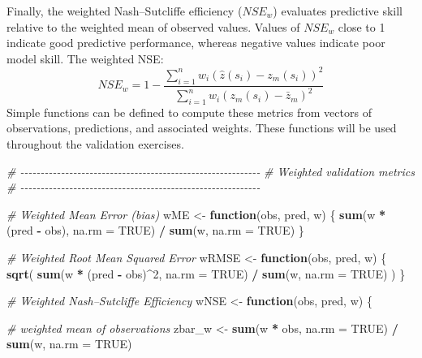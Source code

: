 \documentclass[
  10pt,
  b5paper,
  oneside]{book}
\newenvironment{Shaded}{\begin{snugshade}}{\end{snugshade}}
\newcommand{\AttributeTok}[1]{\textcolor[rgb]{0.13,0.29,0.53}{#1}}
\newcommand{\CommentTok}[1]{\textcolor[rgb]{0.56,0.35,0.01}{\textit{#1}}}
\newcommand{\ConstantTok}[1]{\textcolor[rgb]{0.56,0.35,0.01}{#1}}
\newcommand{\ControlFlowTok}[1]{\textcolor[rgb]{0.13,0.29,0.53}{\textbf{#1}}}
\newcommand{\DecValTok}[1]{\textcolor[rgb]{0.00,0.00,0.81}{#1}}
\newcommand{\FunctionTok}[1]{\textcolor[rgb]{0.13,0.29,0.53}{\textbf{#1}}}
\newcommand{\NormalTok}[1]{#1}
\newcommand{\OtherTok}[1]{\textcolor[rgb]{0.56,0.35,0.01}{#1}}
\newcommand{\SpecialCharTok}[1]{\textcolor[rgb]{0.81,0.36,0.00}{\textbf{#1}}}
\begin{document}
Finally, the weighted Nash--Sutcliffe efficiency (\(NSE_w\)) evaluates predictive skill relative to the weighted mean of observed values.
Values of \(NSE_w\) close to 1 indicate good predictive performance, whereas negative values indicate poor model skill.
The weighted NSE:
\[
NSE_w =
1 -
\frac{
\sum_{i=1}^{n} w_i \left( \hat{z}(s_i) - z_m(s_i) \right)^2
}{
\sum_{i=1}^{n} w_i \left( z_m(s_i) - \bar{z}_m \right)^2
}
\]
Simple functions can be defined to compute these metrics from vectors of observations, predictions, and associated weights. These functions will be used throughout the validation exercises.

\begin{Shaded}
\begin{Highlighting}[]
\CommentTok{\# {-}{-}{-}{-}{-}{-}{-}{-}{-}{-}{-}{-}{-}{-}{-}{-}{-}{-}{-}{-}{-}{-}{-}{-}{-}{-}{-}{-}{-}{-}{-}{-}{-}{-}{-}{-}{-}{-}{-}{-}{-}{-}{-}{-}{-}{-}{-}{-}{-}{-}{-}{-}{-}{-}{-}{-}{-}{-}{-}}
\CommentTok{\# Weighted validation metrics}
\CommentTok{\# {-}{-}{-}{-}{-}{-}{-}{-}{-}{-}{-}{-}{-}{-}{-}{-}{-}{-}{-}{-}{-}{-}{-}{-}{-}{-}{-}{-}{-}{-}{-}{-}{-}{-}{-}{-}{-}{-}{-}{-}{-}{-}{-}{-}{-}{-}{-}{-}{-}{-}{-}{-}{-}{-}{-}{-}{-}{-}{-}}

\CommentTok{\# Weighted Mean Error (bias)}
\NormalTok{wME }\OtherTok{\textless{}{-}} \ControlFlowTok{function}\NormalTok{(obs, pred, w) \{}
  \FunctionTok{sum}\NormalTok{(w }\SpecialCharTok{*}\NormalTok{ (pred }\SpecialCharTok{{-}}\NormalTok{ obs), }\AttributeTok{na.rm =} \ConstantTok{TRUE}\NormalTok{) }\SpecialCharTok{/}
    \FunctionTok{sum}\NormalTok{(w, }\AttributeTok{na.rm =} \ConstantTok{TRUE}\NormalTok{)}
\NormalTok{\}}

\CommentTok{\# Weighted Root Mean Squared Error}
\NormalTok{wRMSE }\OtherTok{\textless{}{-}} \ControlFlowTok{function}\NormalTok{(obs, pred, w) \{}
  \FunctionTok{sqrt}\NormalTok{(}
    \FunctionTok{sum}\NormalTok{(w }\SpecialCharTok{*}\NormalTok{ (pred }\SpecialCharTok{{-}}\NormalTok{ obs)}\SpecialCharTok{\^{}}\DecValTok{2}\NormalTok{, }\AttributeTok{na.rm =} \ConstantTok{TRUE}\NormalTok{) }\SpecialCharTok{/}
      \FunctionTok{sum}\NormalTok{(w, }\AttributeTok{na.rm =} \ConstantTok{TRUE}\NormalTok{)}
\NormalTok{  )}
\NormalTok{\}}

\CommentTok{\# Weighted Nash–Sutcliffe Efficiency}
\NormalTok{wNSE }\OtherTok{\textless{}{-}} \ControlFlowTok{function}\NormalTok{(obs, pred, w) \{}
  
  \CommentTok{\# weighted mean of observations}
\NormalTok{  zbar\_w }\OtherTok{\textless{}{-}} \FunctionTok{sum}\NormalTok{(w }\SpecialCharTok{*}\NormalTok{ obs, }\AttributeTok{na.rm =} \ConstantTok{TRUE}\NormalTok{) }\SpecialCharTok{/}
            \FunctionTok{sum}\NormalTok{(w, }\AttributeTok{na.rm =} \ConstantTok{TRUE}\NormalTok{)}
  

\end{Highlighting}
\end{Shaded}
\end{document}
